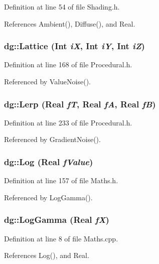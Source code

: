 Definition at line 54 of file Shading.h.

References Ambient(), Diffuse(), and Real.
\subsubsection{ dg::Lattice ({\bf Int} {\em i\-X}, {\bf Int} {\em i\-Y}, {\bf Int} {\em i\-Z})\hspace{0.3cm}{\tt  [inline]}}\label{namespacedg_a148}




Definition at line 168 of file Procedural.h.

Referenced by Value\-Noise().
\subsubsection{ dg::Lerp ({\bf Real} {\em f\-T}, {\bf Real} {\em f\-A}, {\bf Real} {\em f\-B})\hspace{0.3cm}{\tt  [inline]}}\label{namespacedg_a154}




Definition at line 233 of file Procedural.h.

Referenced by Gradient\-Noise().
\subsubsection{ dg::Log ({\bf Real} {\em f\-Value})\hspace{0.3cm}{\tt  [inline]}}\label{namespacedg_a96}




Definition at line 157 of file Maths.h.

Referenced by Log\-Gamma().
\subsubsection{ dg::Log\-Gamma ({\bf Real} {\em f\-X})}\label{namespacedg_a87}




Definition at line 8 of file Maths.cpp.

References Log(), and Real.
